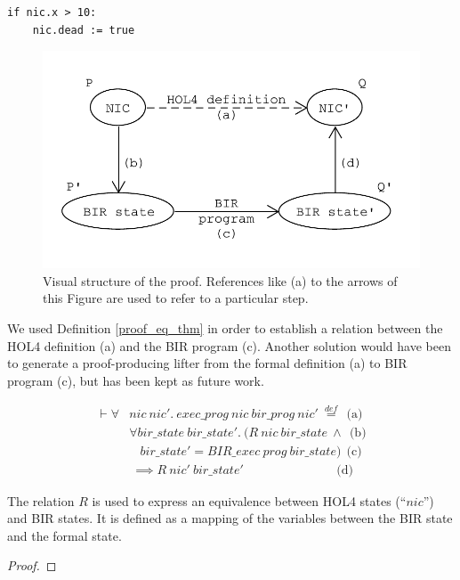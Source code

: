 \documentclass[10pt,a4paper]{article}
\newcommand{\eqdef}{\stackrel{def}{=}}
\begin{document}
\begin{multicols}{2}
\begin{lstlisting}
if nic.x > 10:
    nic.dead := true
\end{lstlisting}
%
\begin{figure}[H]
	\includegraphics[width=\columnwidth]{figures/proof_schema.pdf}
	\centering
	\caption{Visual structure of the proof. References like (a) to the arrows of this Figure are used to refer to a particular step.}
	\label{proof_schema}
\end{figure}
%
\par We used Definition \ref{proof_eq_thm} in order to establish a relation between the HOL4 definition (a) and the BIR program (c). Another solution would have been to generate a proof-producing lifter from the formal definition (a) to BIR program (c), but has been kept as future work.
%
\begin{small}
  \begin{equation}
  \begin{split}
    \vdash \forall &nic~nic'.~exec\_prog~nic~bir\_prog~nic'~\eqdef ~~ \text{(a)}\\
      &\forall bir\_state~bir\_state'.~(R~nic~bir\_state~\land ~~ \text{(b)}\\
            &~~~~bir\_state' = BIR\_exec~prog~bir\_state) ~~ \text{(c)}\\
            &~\implies R~nic'~bir\_state' ~~~~~~~~~~~~~~~~~~~~~~~~~~~~~~~~~\, \text{(d)}
  \end{split}
  \label{proof_eq_thm}
  \end{equation}
\end{small}
%
\par The relation $R$ is used to express an equivalence between HOL4 states (``$nic$'') and BIR states. It is defined as a mapping of the variables between the BIR state and the formal state.

\begin{proof}


\end{proof}
\end{multicols}
\end{document}
